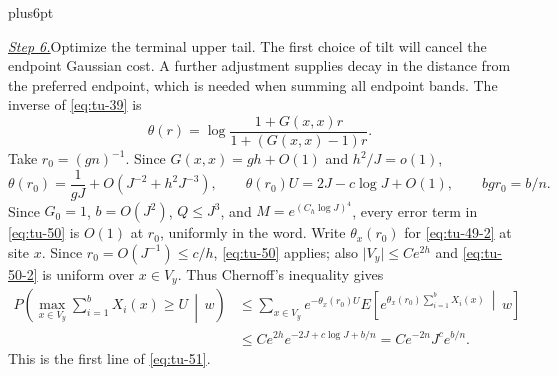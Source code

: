 \documentclass[12pt,reqno]{amsart}
\makeatletter
\theoremstyle{plain}
\theoremstyle{definition}
\theoremstyle{remark}
\renewenvironment{proof}[1][\proofname]{%
  \par
  \pushQED{\qed}%
  \normalfont
  \topsep6pt plus6pt\relax
  \trivlist
  \item[\hskip\labelsep\slshape #1\@addpunct{.}]%
  \ignorespaces
}{%
  \popQED
  \endtrivlist
  \@endpefalse
}
\DeclareRobustCommand{\qed}{%
  \leavevmode\unskip\penalty9999\hbox{}\nobreak
  \ifmmode
    \makebox[0pt][l]{\qquad\hbox{\qedsymbol}}%
  \else
    \qquad\hbox{\qedsymbol}%
  \fi
}
\renewcommand{\qedsymbol}{\rule[.47pt]{4pt}{6pt}}
\numberwithin{equation}{section}
\makeatother
\begin{document}
\begin{proof}[Proof of Lemma~\ref{lem:terminal-feynman-kac}]
\smallskip\noindent
\underline{\textit{Step 6.}}\quad Optimize the terminal upper tail.
The first choice of tilt will cancel the endpoint Gaussian cost. A further
adjustment supplies decay in the distance from the preferred endpoint,
which is needed when summing all endpoint bands. The inverse of \eqref{eq:tu-39} is
\begin{equation}
       \theta(r)=
       \log\frac{1+G(x,x)r}{1+(G(x,x)-1)r}.                   \label{eq:tu-49-2}
\end{equation}
Take \(r_0=(gn)^{-1}\).  Since
\(G(x,x)=gh+O(1)\) and \(h^2/J=o(1)\),
\begin{equation}
 \theta(r_0)=\frac1{gJ}+O(J^{-2}+h^2J^{-3}),\qquad
 \theta(r_0)U=2J-c\log J+O(1),\qquad bg r_0=b/n.              \label{eq:tu-50-2}
\end{equation}
Since \(G_0=1\), \(b=O(J^2)\), \(Q\le J^3\), and
\(M=e^{(C_h\log J)^4}\), every error term in \eqref{eq:tu-50}
is \(O(1)\) at \(r_0\), uniformly in the word.
Write \(\theta_x(r_0)\) for \eqref{eq:tu-49-2} at site \(x\).
Since \(r_0=O(J^{-1})\le c/h\), \eqref{eq:tu-50} applies; also
\(\lvert V_y\rvert\le Ce^{2h}\) and \eqref{eq:tu-50-2} is uniform over
\(x\in V_y\). Thus Chernoff's inequality gives
\[
\begin{aligned}
 P\left(\max_{x\in V_y}\sum_{i=1}^bX_i(x)\ge U\,\middle|\,w\right)
 &\le\sum_{x\in V_y}e^{-\theta_x(r_0)U}
   E\left[e^{\theta_x(r_0)\sum_{i=1}^bX_i(x)}\,\middle|\,w\right]\\
 &\le Ce^{2h}e^{-2J+c\log J+b/n}
   =Ce^{-2n}J^c e^{b/n}.
\end{aligned}
\]
This is the first line of \eqref{eq:tu-51}.


\end{proof}
\end{document}
